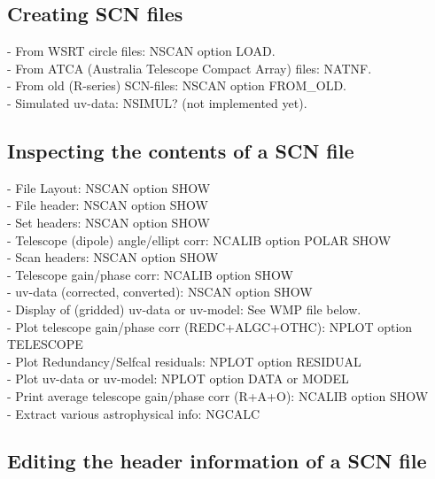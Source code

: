 \subsection{Creating SCN files} 
\label{scn.create} 

- From WSRT circle files: NSCAN option LOAD. \\ 
- From ATCA (Australia Telescope Compact Array) files: NATNF.\\ 
- From old (R-series) SCN-files: NSCAN option FROM\_OLD.\\ 
- Simulated uv-data: NSIMUL? (not implemented yet).\\ 

\subsection{Inspecting the contents of a SCN file} 
\label{scn.inspect} 

- File Layout: NSCAN option SHOW\\ 
- File header: NSCAN option SHOW\\ 
- Set headers: NSCAN option SHOW\\ 
\hspace*{5mm} - Telescope (dipole) angle/ellipt corr: NCALIB option POLAR
SHOW\\ 
- Scan headers: NSCAN option SHOW\\ 
\hspace*{5mm} - Telescope gain/phase corr: NCALIB option SHOW\\ 
- uv-data (corrected, converted): NSCAN option SHOW\\ 
- Display of (gridded) uv-data or uv-model: See WMP file below.\\ 
- Plot telescope gain/phase corr (REDC+ALGC+OTHC): NPLOT option TELESCOPE\\ 
- Plot Redundancy/Selfcal residuals: NPLOT option RESIDUAL\\ 
- Plot uv-data or uv-model: NPLOT option DATA or MODEL\\ 
- Print average telescope gain/phase corr (R+A+O): NCALIB option SHOW\\ 
- Extract various astrophysical info: NGCALC\\ 

\subsection{Editing the header information of a SCN file} 
\label{scn.int} 


